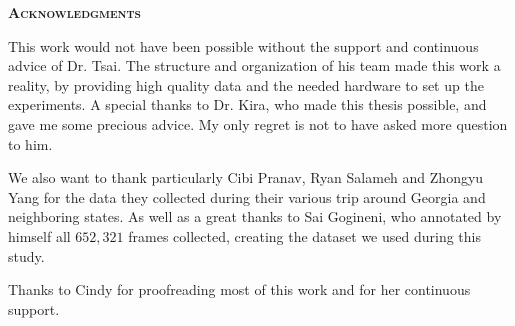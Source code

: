 \clearpage
\begin{centering}
\textbf{\textsc{Acknowledgments}}\\
\vspace{\baselineskip}
\end{centering}



This work would not have been possible without the support and continuous advice of Dr. Tsai. The structure and organization of his team made this work a reality, by providing high quality data and the needed hardware to set up the experiments. A special thanks to Dr. Kira, who made this thesis possible, and gave me some precious advice. My only regret is not to have asked more question to him.

We also want to thank particularly Cibi Pranav, Ryan Salameh and Zhongyu Yang for the data they collected during their various trip around Georgia and neighboring states. As well as a great thanks to Sai Gogineni, who annotated by himself all $652,321$ frames collected, creating the dataset we used during this study.

Thanks to Cindy for proofreading most of this work and for her continuous support.


\clearpage
